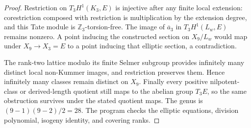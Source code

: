 \begin{proof}
Restriction on $T_3H^1(K_3,E)$ is
injective after any finite local
extension: corestriction composed
with restriction is multiplication
by the extension degree, and this
Tate module is $\mathbb Z_3$-torsion-free.
The image of $\overline a_3$ in
$T_3H^1(L_w,E)$ remains nonzero.
A point inducing the constructed
section on $X_9/L_w$ would map under
$X_9\to X_3=E$ to a point inducing
that elliptic section, a contradiction.

The rank-two lattice modulo its
finite Selmer subgroup provides
infinitely many distinct local
non-Kummer images, and restriction
preserves them. Hence infinitely
many classes remain distinct on
$X_9$. Finally every positive
nilpotent-class or derived-length
quotient still maps to the abelian
group $T_3E$, so the same obstruction
survives under the stated quotient
maps. The genus is
$(9-1)(9-2)/2=28$.
The program checks the elliptic
equations, division polynomial,
isogeny identity, and covering ranks.
\end{proof}


